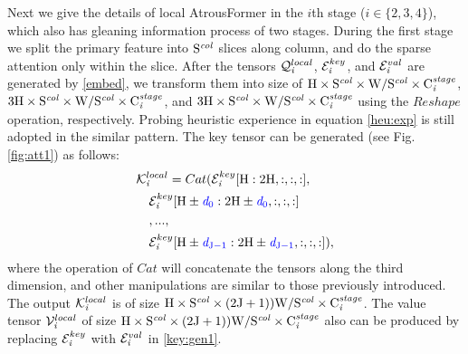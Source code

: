 \documentclass[preprint,12pt,review]{elsarticle}
\begin{document}
Next we give the details of local AtrousFormer in the $i$th stage ($i\in \{2,3,4\}$), which also has gleaning information process of two stages. During the first stage we split the primary feature into $\rm{S}^{\it{col}}$ slices along column, and do the sparse attention only within the slice. After the tensors $\mathcal{Q}_{\it{i}}^{local}$, $\mathcal{E}_{\it{i}}^{key}$, and $\mathcal{E}_{\it{i}}^{val}$ are generated by \eqref{embed}, we transform them into size of $\rm{H}\times \rm{S}^{\it{col}} \times W/\rm{S}^{\it{col}} \times C_{\it{i}}^{\it{stage}}$, $3\rm{H}\times \rm{S}^{\it{col}} \times W/\rm{S}^{\it{col}} \times C_{\it{i}}^{\it{stage}}$, and $3\rm{H}\times \rm{S}^{\it{col}} \times W/\rm{S}^{\it{col}} \times C_{\it{i}}^{\it{stage}}$ using the $Reshape$ operation, respectively. Probing heuristic experience in equation \eqref{heu:exp}  is still adopted in the similar pattern.
The key tensor can be generated (see Fig.\ref{fig:att1}) as follows:
\begin{align}\label{key:gen1}
	&\mathcal{K}_{\it{i}}^{local} = Cat(\mathcal{E}_{\it{i}}^{key}[\rm{H}: 2\rm{H}, :, :, :],\nonumber \\
	&\quad \mathcal{E}_{\it{i}}^{key}[\rm{H}\pm \textcolor{blue}{\it{d}_{\rm 0}}: 2\rm{H}\pm \textcolor{blue}{\it{d}_{\rm 0}}, :, :, :]\nonumber \\
	&\quad ,..., \nonumber \\
	&\quad \mathcal{E}_{\it{i}}^{key}[\rm{H}\pm \textcolor{blue}{\it{d}_{\rm J-1}}: 2\rm{H}\pm \textcolor{blue}{\it{d}_{\rm J-1}}, :, :, :]),
\end{align}
where the operation of $Cat$ will concatenate the tensors along the third dimension, and other manipulations are similar to those previously introduced. The output $\mathcal{K}_{\it{i}}^{local}$ is of size $\rm{H}\times \rm{S}^{\it{col}} \times (2\rm{J}+1))\rm{W}/\rm{S}^{\it{col}}\times C_{\it{i}}^{\it{stage}}$. The value tensor $\mathcal{V}_{\it{i}}^{local}$ of size $\rm{H}\times \rm{S}^{\it{col}} \times (2\rm{J}+1))\rm{W}/\rm{S}^{\it{col}} \times C_{\it{i}}^{\it{stage}}$ also can be produced by replacing $\mathcal{E}_{\it{i}}^{key}$ with $\mathcal{E}_{\it{i}}^{val}$ in \eqref{key:gen1}. 
\end{document}
